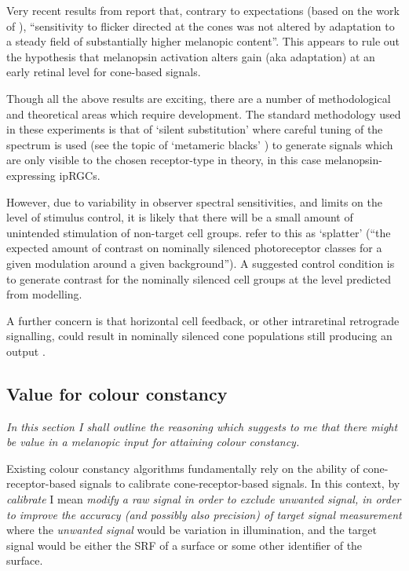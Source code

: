 Very recent results from \textbf{\citet{vincent_adaptation_2019,vincent_adaptation_2019-1}} report that, contrary to expectations (based on the work of \citet{allen_melanopsin-driven_2014}), ``sensitivity to flicker directed at the cones was not altered by adaptation to a steady field of substantially higher melanopic content''. This appears to rule out the hypothesis that melanopsin activation alters gain (aka adaptation) at an early retinal level for cone-based signals.

Though all the above results are exciting, there are a number of methodological and theoretical areas which require development. The standard methodology used in these experiments is that of `silent substitution' \citep{estevez_silent_1982,kamar_silent-substitution_2019,spitschan_method_2018} where careful tuning of the spectrum is used (see the topic of `metameric blacks' \citep{vienot_verriest_2014,cohen_metameric_1982,vienot_domain_2012,vienot_dimensionality_2015}) to generate signals which are only visible to the chosen receptor-type in theory, in this case melanopsin-expressing \glspl{ipRGC}. 

However, due to variability in observer spectral sensitivities, and limits on the level of stimulus control, it is likely that there will be a small amount of unintended stimulation of non-target cell groups. \citet{spitschan_selective_2015} refer to this as `splatter' (``the expected amount of contrast on nominally silenced photoreceptor classes for a given modulation around a given background''). A suggested control condition is to generate contrast for the nominally silenced cell groups at the level predicted from modelling.

A further concern is that horizontal cell feedback, or other intraretinal retrograde signalling, could result in nominally silenced cone populations still producing an output \citep{kamar_silent-substitution_2019}.

\subsection{Value for colour constancy}

\emph{In this section I shall outline the reasoning which suggests to me that there might be value in a melanopic input for attaining colour constancy.}

Existing colour constancy algorithms fundamentally rely on the ability of cone-receptor-based signals to calibrate cone-receptor-based signals. In this context, by \emph{calibrate} I mean  \emph{modify a raw signal in order to exclude unwanted signal, in order to improve the accuracy (and possibly also precision) of target signal measurement} where the \emph{unwanted signal} would be variation in illumination, and the target signal would be either the \gls{SRF} of a surface or some other identifier of the surface.


